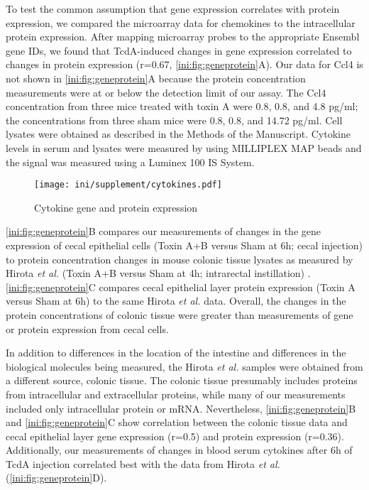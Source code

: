 To test the common assumption that gene expression correlates
with protein expression, we compared the microarray data for chemokines to the
intracellular protein expression. After mapping
microarray probes to the appropriate Ensembl gene IDs, we found that TcdA-induced 
changes in gene expression correlated to changes in protein 
expression (r=0.67, \autoref{ini:fig:geneprotein}A). Our data for Ccl4 is not shown
in \autoref{ini:fig:geneprotein}A because the protein concentration measurements
were at or below the detection limit of our assay. The Ccl4 concentration from
three mice treated with toxin A were 0.8, 0.8, and 4.8 pg/ml; the concentrations
from three sham mice were 0.8, 0.8, and 14.72 pg/ml. Cell 
lysates were obtained as described in the Methods of the Manuscript.
Cytokine levels in serum and lysates were measured by using
MILLIPLEX\textsuperscript{\textregistered{}}
MAP beads and the signal was measured using a Luminex 100 IS System.

\begin{figure}[ht]
\centering
\texttt{[image: ini/supplement/cytokines.pdf]}
\caption{Cytokine gene and protein expression}
\label{ini:fig:geneprotein}
\end{figure}

\autoref{ini:fig:geneprotein}B compares our measurements of changes in the gene expression 
of cecal epithelial cells (Toxin A+B versus Sham at 6h; cecal injection) 
to protein concentration changes 
in mouse colonic tissue lysates as measured by
Hirota \emph{et al.} (Toxin A+B versus Sham at 4h; intrarectal instillation) \cite{Hirota:2012gx}. 
\autoref{ini:fig:geneprotein}C compares cecal epithelial layer protein expression (Toxin A
versus Sham at 6h) to the same Hirota \emph{et al.} data.
Overall, the changes in the protein concentrations of colonic tissue were greater
than measurements of gene or protein expression from cecal cells. 

In addition to differences in the location of the intestine and 
differences in the biological molecules being measured, the 
Hirota \emph{et al.} samples were obtained from a different source, colonic tissue.
The colonic tissue presumably includes proteins from
intracellular and extracellular proteins, while many of our measurements included
only intracellular protein or mRNA. Nevertheless, \autoref{ini:fig:geneprotein}B
and \autoref{ini:fig:geneprotein}C show correlation between the colonic tissue
data and cecal epithelial layer gene expression (r=0.5) and protein
expression (r=0.36). Additionally, our measurements of changes in blood serum
cytokines after 6h of TcdA injection correlated best with the data from 
Hirota \emph{et al.} (\autoref{ini:fig:geneprotein}D).

